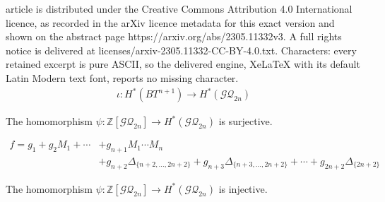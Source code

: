 \documentclass[10pt,a4paper]{amsart}
\begin{document}
article is distributed under the Creative Commons Attribution 4.0 International licence, as recorded in the arXiv licence metadata for this exact version and shown on the abstract page https://arxiv.org/abs/2305.11332v3. A full rights notice is delivered at licenses/arxiv-2305.11332-CC-BY-4.0.txt. Characters: every retained excerpt is pure ASCII, so the delivered engine, XeLaTeX with its default Latin Modern text font, reports no missing character.
\begin{align}
\label{algebra-structure}
\iota:H^{*}(BT^{n+1}) \to H^{*}(\mathcal{GQ}_{2n})
\end{align}

\begin{lemma}
\label{surjectivity}
The homomorphism 
$\psi:\mathbb{Z}[\mathcal{GQ}_{2n}]\to H^{*}(\mathcal{GQ}_{2n})$
is surjective.
\end{lemma}

\begin{align}
\label{linear-relation}
f=g_{1}+g_{2}M_{1}+\cdots &+g_{n+1}M_{1}\cdots M_{n} \\
&+g_{n+2}\Delta_{\{n+2,\ldots, 2n+2\}}+g_{n+3}\Delta_{\{n+3,\ldots, 2n+2\}}+\cdots 
+g_{2n+2}\Delta_{\{2n+2\}} \nonumber
\end{align}

\begin{lemma}
\label{injectivity}
The homomorphism 
$\psi:\mathbb{Z}[\mathcal{GQ}_{2n}]\to H^{*}(\mathcal{GQ}_{2n})$
is injective.
\end{lemma}
\end{document}
